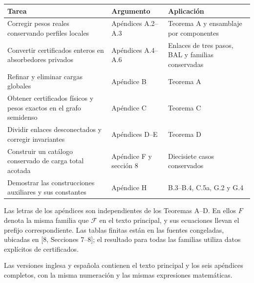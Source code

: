 \documentclass[spanish,11pt,a4paper]{article}
\begin{document}
{\begin{longtable}[]{@{}
  >{\raggedright\arraybackslash}p{}
  >{\raggedright\arraybackslash}p{}
  >{\raggedright\arraybackslash}p{}@{}}
\toprule\noalign{}
\begin{minipage}[b]{\linewidth}\raggedright
Tarea
\end{minipage} & \begin{minipage}[b]{\linewidth}\raggedright
Argumento
\end{minipage} & \begin{minipage}[b]{\linewidth}\raggedright
Aplicación
\end{minipage} \\
\midrule\noalign{}
\endhead
\bottomrule\noalign{}
\endlastfoot
Corregir pesos reales conservando perfiles locales & Apéndices A.2--A.3 & Teorema A y ensamblaje por componentes \\
Convertir certificados enteros en absorbedores privados & Apéndices A.4--A.6 & Enlaces de tres pasos, BAL y familias conservadas \\
Refinar y eliminar cargas globales & Apéndice B & Teorema A \\
Obtener certificados físicos y pesos exactos en el grafo semidenso & Apéndice C & Teorema C \\
Dividir enlaces desconectados y corregir invariantes & Apéndices D--E & Teorema D \\
Construir un catálogo conservado de carga total acotada & Apéndice F y sección 8 & Diecisiete casos conservados \\
Demostrar las construcciones auxiliares y sus constantes & Apéndice H & B.3--B.4, C.5a, G.2 y G.4 \\
\end{longtable}
}

Las letras de los apéndices son independientes de los Teoremas A--D. En ellos \(F\) denota la misma familia que \(\mathcal F\) en el texto principal, y sus ecuaciones llevan el prefijo correspondiente. Las tablas finitas están en las fuentes congeladas, ubicadas en {[}8, Secciones 7--8{]}; el resultado para todas las familias utiliza datos explícitos de certificados.

Las versiones inglesa y española contienen el texto principal y los seis apéndices completos, con la misma numeración y las mismas expresiones matemáticas.


\end{document}
